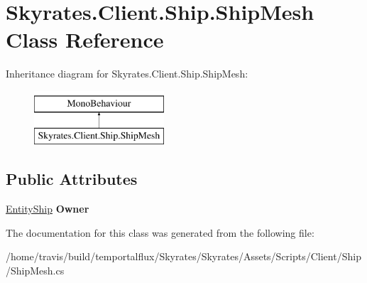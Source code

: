 \hypertarget{class_skyrates_1_1_client_1_1_ship_1_1_ship_mesh}{\section{Skyrates.\-Client.\-Ship.\-Ship\-Mesh Class Reference}
\label{class_skyrates_1_1_client_1_1_ship_1_1_ship_mesh}
}
Inheritance diagram for Skyrates.\-Client.\-Ship.\-Ship\-Mesh\-:\begin{figure}[H]
\begin{center}
\leavevmode
\includegraphics[height=2.000000cm]{class_skyrates_1_1_client_1_1_ship_1_1_ship_mesh}
\end{center}
\end{figure}
\subsection*{Public Attributes}
\begin{DoxyCompactItemize}
\item 
\hypertarget{class_skyrates_1_1_client_1_1_ship_1_1_ship_mesh_abc006fd69661c2fae079f6b5615405d1}{\hyperlink{class_skyrates_1_1_client_1_1_entity_1_1_entity_ship}{Entity\-Ship} {\bfseries Owner}}\label{class_skyrates_1_1_client_1_1_ship_1_1_ship_mesh_abc006fd69661c2fae079f6b5615405d1}

\end{DoxyCompactItemize}


The documentation for this class was generated from the following file\-:\begin{DoxyCompactItemize}
\item 
/home/travis/build/temportalflux/\-Skyrates/\-Skyrates/\-Assets/\-Scripts/\-Client/\-Ship/Ship\-Mesh.\-cs\end{DoxyCompactItemize}
